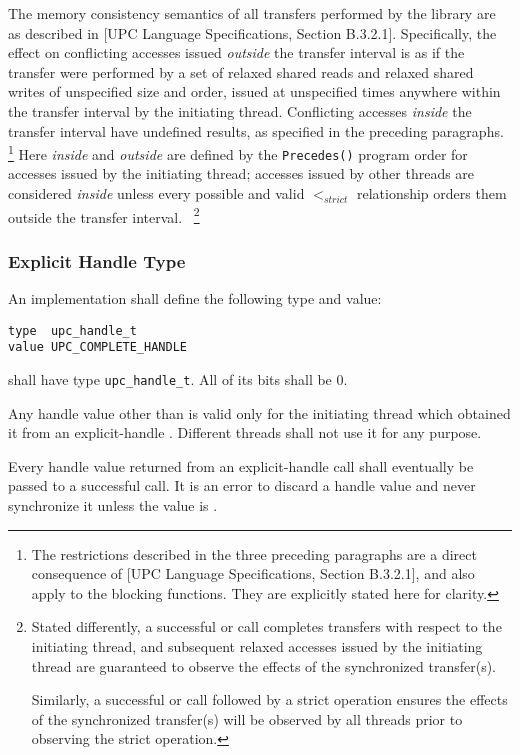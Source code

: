 \np The memory consistency semantics of all transfers performed by the library are as described in 
[UPC Language Specifications, Section B.3.2.1]. Specifically, the effect on
conflicting accesses issued {\em outside} the transfer interval is as if the transfer were
performed by a set of relaxed shared reads and relaxed shared writes of
unspecified size and order, issued at unspecified times anywhere within the transfer
interval by the initiating thread. Conflicting accesses {\em inside} the transfer interval
have undefined results, as specified in the preceding paragraphs.~%
\footnote{The restrictions described in the three preceding paragraphs are a direct consequence of 
[UPC Language Specifications, Section B.3.2.1], and also apply to the blocking \memstar functions.
They are explicitly stated here for clarity.}
Here {\em inside} and {\em outside} are defined by the {\tt Precedes()} program order for 
accesses issued by the initiating thread; accesses issued by other threads are considered {\em inside} 
unless every possible and valid $<_{strict}$ relationship orders them outside the transfer interval.~%
\footnote{
Stated differently, a successful \sync or \synci call completes transfers with respect 
to the initiating thread, and subsequent relaxed accesses issued by the initiating thread
are guaranteed to observe the effects of the synchronized transfer(s).

Similarly, a successful \sync or \synci call followed by a strict operation 
ensures the effects of the synchronized transfer(s) will be observed by all 
threads prior to observing the strict operation.  
}

\newpage
\subsubsection{Explicit Handle Type}
\npf An implementation shall define the following type and value:

\begin{verbatim}
type  upc_handle_t
value UPC_COMPLETE_HANDLE
\end{verbatim}

\np \complete shall have type {\tt upc\_handle\_t}.  All of its bits shall be 0.

\np Any handle value other than \complete is valid only for the initiating thread which 
obtained it from an explicit-handle \TIF.
Different threads shall not use it for any purpose.

\np Every handle value returned from an explicit-handle \TIF call shall eventually be passed to
a successful \sync call.  It is an error to discard a handle value and never
synchronize it unless the value is \complete. 

